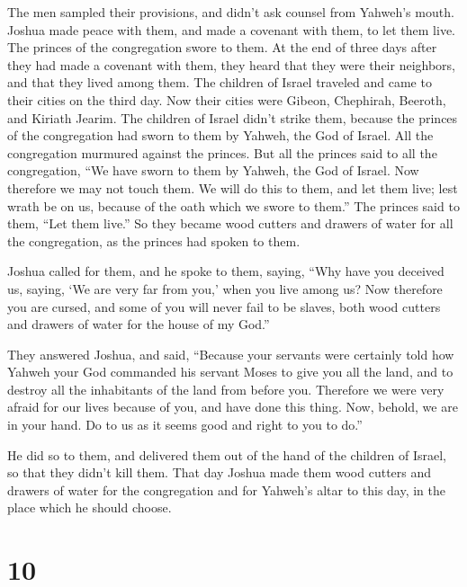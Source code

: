  The men sampled their provisions, and didn't ask counsel
from Yahweh's mouth.  Joshua made peace with them, and made
a covenant with them, to let them live. The princes of the congregation
swore to them.  At the end of three days after they had
made a covenant with them, they heard that they were their neighbors,
and that they lived among them.  The children of Israel
traveled and came to their cities on the third day. Now their cities
were Gibeon, Chephirah, Beeroth, and Kiriath Jearim.  The
children of Israel didn't strike them, because the princes of the
congregation had sworn to them by Yahweh, the God of Israel. All the
congregation murmured against the princes.  But all the
princes said to all the congregation, ``We have sworn to them by Yahweh,
the God of Israel. Now therefore we may not touch them.  We
will do this to them, and let them live; lest wrath be on us, because of
the oath which we swore to them.''  The princes said to
them, ``Let them live.'' So they became wood cutters and drawers of
water for all the congregation, as the princes had spoken to them.

 Joshua called for them, and he spoke to them, saying,
``Why have you deceived us, saying, `We are very far from you,' when you
live among us?  Now therefore you are cursed, and some of
you will never fail to be slaves, both wood cutters and drawers of water
for the house of my God.''

 They answered Joshua, and said, ``Because your servants
were certainly told how Yahweh your God commanded his servant Moses to
give you all the land, and to destroy all the inhabitants of the land
from before you. Therefore we were very afraid for our lives because of
you, and have done this thing.  Now, behold, we are in your
hand. Do to us as it seems good and right to you to do.''

 He did so to them, and delivered them out of the hand of
the children of Israel, so that they didn't kill them. 
That day Joshua made them wood cutters and drawers of water for the
congregation and for Yahweh's altar to this day, in the place which he
should choose.

\hypertarget{section-9}{%
\section{10}\label{section-9}}


